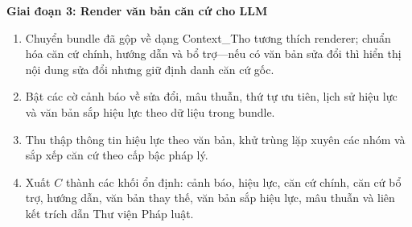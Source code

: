 \documentclass[../DoAn.tex]{subfiles}
\begin{document}
\begin{algorithm}[H]
\textbf{Giai đoạn 3: Render văn bản căn cứ cho LLM}

\begin{enumerate}[label=\textbf{Bước \arabic*.}, leftmargin=1.6cm, resume]
    \item Chuyển bundle đã gộp về dạng Context\_Tho tương thích renderer; chuẩn hóa căn cứ chính, hướng dẫn và bổ trợ---nếu có văn bản sửa đổi thì hiển thị nội dung sửa đổi nhưng giữ định danh căn cứ gốc.
    \item Bật các cờ cảnh báo về sửa đổi, mâu thuẫn, thứ tự ưu tiên, lịch sử hiệu lực và văn bản sắp hiệu lực theo dữ liệu trong bundle.
    \item Thu thập thông tin hiệu lực theo văn bản, khử trùng lặp xuyên các nhóm và sắp xếp căn cứ theo cấp bậc pháp lý.
    \item Xuất $C$ thành các khối ổn định: cảnh báo, hiệu lực, căn cứ chính, căn cứ bổ trợ, hướng dẫn, văn bản thay thế, văn bản sắp hiệu lực, mâu thuẫn và liên kết trích dẫn Thư viện Pháp luật.
\end{enumerate}
\caption{Giải thuật truy xuất, lọc hiệu lực, mã hoá bundle và phân loại căn cứ pháp lý}
\label{algo:legal_temporal}
\end{algorithm}
\end{document}

